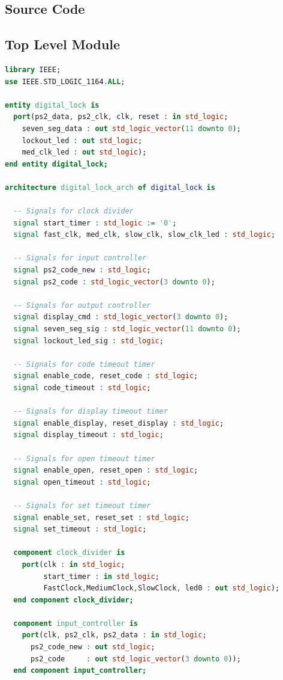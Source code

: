 \documentclass[11pt]{article}
\begin{document}
\begin{appendices}

\section{Source Code}

\subsection{Top Level Module}

\begin{lstlisting}[language=VHDL]
library IEEE;
use IEEE.STD_LOGIC_1164.ALL;

entity digital_lock is
  port(ps2_data, ps2_clk, clk, reset : in std_logic;
    seven_seg_data : out std_logic_vector(11 downto 0);
    lockout_led : out std_logic;
    med_clk_led : out std_logic);
end entity digital_lock;

architecture digital_lock_arch of digital_lock is

  -- Signals for clock divider
  signal start_timer : std_logic := '0';
  signal fast_clk, med_clk, slow_clk, slow_clk_led : std_logic;

  -- Signals for input controller
  signal ps2_code_new : std_logic;
  signal ps2_code : std_logic_vector(3 downto 0);

  -- Signals for output controller
  signal display_cmd : std_logic_vector(3 downto 0);
  signal seven_seg_sig : std_logic_vector(11 downto 0);
  signal lockout_led_sig : std_logic;

  -- Signals for code timeout timer
  signal enable_code, reset_code : std_logic;
  signal code_timeout : std_logic;

  -- Signals for display timeout timer
  signal enable_display, reset_display : std_logic;
  signal display_timeout : std_logic;

  -- Signals for open timeout timer
  signal enable_open, reset_open : std_logic;
  signal open_timeout : std_logic;

  -- Signals for set timeout timer
  signal enable_set, reset_set : std_logic;
  signal set_timeout : std_logic;

  component clock_divider is
    port(clk : in std_logic;
         start_timer : in std_logic;
         FastClock,MediumClock,SlowClock, led0 : out std_logic);
  end component clock_divider;

  component input_controller is
    port(clk, ps2_clk, ps2_data : in std_logic;
      ps2_code_new : out std_logic;
      ps2_code     : out std_logic_vector(3 downto 0));
  end component input_controller;


\end{lstlisting}
\end{appendices}
\end{document}
